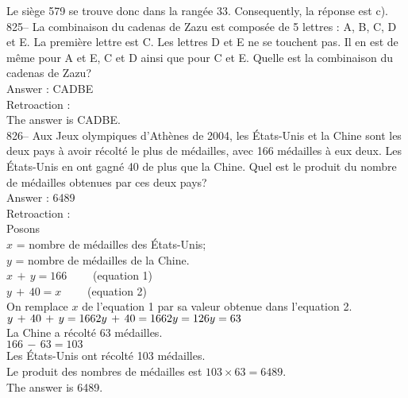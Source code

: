﻿\documentclass[letterpaper, 12pt]{article}
\begin{document}
Le si\`ege 579 se trouve donc dans la rang\'ee 33.  Consequently, la
r\'eponse est c).\\

825-- La combinaison du cadenas de Zazu est compos\'ee de 5 lettres : A, B,
C, D et E.  La premi\`ere lettre est C.  Les lettres D et E ne se touchent
pas.  Il en est de m\^eme pour A et E, C et D ainsi que pour C et E.  Quelle
est la combinaison du cadenas de Zazu?\\

Answer : CADBE\\

Retroaction : \\
The answer is CADBE.\\

826-- Aux Jeux olympiques d'Ath\`enes de 2004, les \'Etats-Unis et la Chine
sont les deux pays \`a avoir r\'ecolt\'e le plus de m\'edailles,  avec 166
m\'edailles \`a eux deux.  Les \'Etats-Unis en ont gagn\'e 40 de plus que la
Chine.  Quel est le produit du nombre de m\'edailles obtenues par ces deux
pays?\\

Answer : 6489\\

Retroaction : \\
Posons\\
$x$ = nombre de m\'edailles des \'Etats-Unis;\\
$y$ = nombre de m\'edailles de la Chine.\\

$x\,+\,y=166 \qquad$ (equation 1)\\
$y\,+\,40=x \qquad$ (equation 2)\\

On remplace $x$ de l'equation 1 par sa valeur obtenue dans l'equation
2.\\
$y\,+\,40\,+\,y=166\\
2y\,+\,40=166\\
2y=126\\
y=63$\\
La Chine a r\'ecolt\'e 63 m\'edailles.\\

$166\,-\,63=103$\\
Les \'Etats-Unis ont r\'ecolt\'e 103 m\'edailles.  \\

Le produit des nombres de m\'edailles est $103\times63=6489$.\\
The answer is 6489.\\
\end{document}
